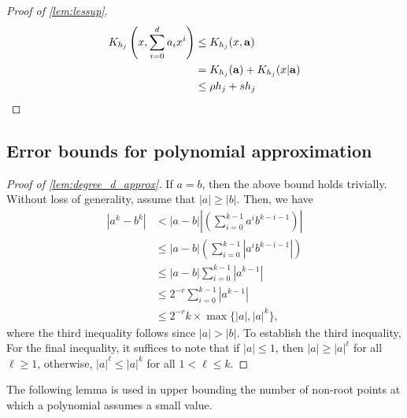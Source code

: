 \documentclass[a4paper,UKenglish,cleveref,autoref,thm-restate]{lipics-v2021}
\begin{document}
\begin{proof}[Proof of \cref{lem:lessup}]
	\begin{align*}
		K_{h_j}\left(x,\sum_{i=0}^{d}a_ix^i\right)&\leq K_{h_j}(x,\mathbf{a})\\
		&=K_{h_j}(\mathbf{a})+K_{h_j}(x|\mathbf{a})\\
		&\leq\rho h_j+sh_j\qedhere
	\end{align*}
\end{proof}


























\subsection{Error bounds for polynomial approximation}

\begin{proof}
  [Proof of \cref{lem:degree_d_approx}]
  If $a=b$, then the above bound holds trivially. Without loss of
  generality, assume that $|a|\ge|b|$. Then, we have
\begin{align*}
\left|a^k - b^k\right|
&< |a-b| \left|\left(\sum_{i=0}^{k-1}a^ib^{k-i-1}\right)\right|\\
&\le |a-b| \left(\sum_{i=0}^{k-1}\left|a^ib^{k-i-1}\right|\right)\\
&\le |a-b| \sum_{i=0}^{k-1} \left|a^{k-1}\right|\\
&\le 2^{-r} \sum_{i=0}^{k-1} \left|a^{k-1}\right|\\
&\le 2^{-r}k\times\max\{|a|,|a|^k\},
\end{align*}
where the third inequality follows since $|a|>|b|$. To establish the
third inequality, For the final inequality, it suffices to note
that if $|a|\le 1$, then $|a|\ge |a|^\ell$ for all $\ell \ge 1$,
otherwise, $|a|^\ell \le |a|^k$ for all $1 < \ell \le k$.
\end{proof}


The following lemma is used in upper bounding the number of non-root
points at which a polynomial assumes a small value. 
\end{document}
